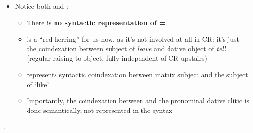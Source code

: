 \documentclass[11pt]{article}
\begin{document}
\begin{itemize}
\item Notice both \avm{\1} and \avm{\2}: \begin{itemize}
    \item There is \textbf{no syntactic representation of \avm{\1} = \avm{\2}}
    \item \avm{\2} is a ``red herring'' for us now, as it's not involved at all in CR: it's just the coindexation between subject of \textit{leave} and dative object of \textit{tell} (regular raising to object, fully independent of CR upstairs)
    \item \avm{\1} represents  syntactic coindexation between matrix subject and the subject of `like'
    \item Importantly, the coindexation between \avm{\1} and the pronominal dative clitic is done semantically, not represented in the syntax
    \end{itemize}
\end{itemize}

\ex. 
\end{document}
